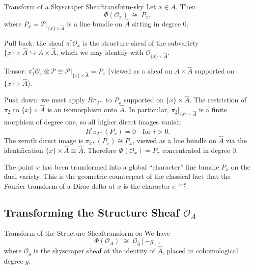 \documentclass{article}
\newcommand{\CO}{{\mathcal{O}}}
\newcommand{\CP}{{\mathcal{P}}}
\begin{document}
\begin{prop}{Transform of a Skyscraper Sheaf}{transform-sky}
Let $x \in A$. Then
\[
    \Phi(\CO_x) \;\cong\; P_x,
\]
where $P_x = \CP|_{\{x\} \times \hat{A}}$ is a line bundle on $\hat{A}$ sitting in degree $0$.
\end{prop}

\begin{Proof}
Pull back: the sheaf $\pi_1^* \CO_x$ is the structure sheaf of the subvariety $\{x\} \times \hat{A} \hookrightarrow A \times \hat{A}$, which we may identify with $\CO_{\{x\} \times \hat{A}}$.

Tensor: $\pi_1^*\CO_x \otimes \CP \cong \CP|_{\{x\} \times \hat{A}} = P_x$ (viewed as a sheaf on $A \times \hat{A}$ supported on $\{x\} \times \hat{A}$).

Push down: we must apply $R\pi_{2*}$ to $P_x$ supported on $\{x\} \times \hat{A}$. The restriction of $\pi_2$ to $\{x\} \times \hat{A}$ is an isomorphism onto $\hat{A}$. In particular, $\pi_2|_{\{x\} \times \hat{A}}$ is a finite morphism of degree one, so all higher direct images vanish:
\[
    R^i \pi_{2*}(P_x) = 0 \quad \text{for } i > 0.
\]
The zeroth direct image is $\pi_{2*}(P_x) \cong P_x$, viewed as a line bundle on $\hat{A}$ via the identification $\{x\} \times \hat{A} \cong \hat{A}$. Therefore $\Phi(\CO_x) = P_x$ concentrated in degree $0$.
\end{Proof}

The point $x$ has been transformed into a global ``character'' line bundle $P_x$ on the dual variety. This is the geometric counterpart of the classical fact that the Fourier transform of a Dirac delta at $x$ is the character $e^{-ix\xi}$.


\subsection{Transforming the Structure Sheaf $\CO_A$}

\begin{prop}{Transform of the Structure Sheaf}{transform-oa}
We have
\[
    \Phi(\CO_A) \;\cong\; \CO_{\hat{0}}[-g],
\]
where $\CO_{\hat{0}}$ is the skyscraper sheaf at the identity of $\hat{A}$, placed in cohomological degree $g$.
\end{prop}
\end{document}
